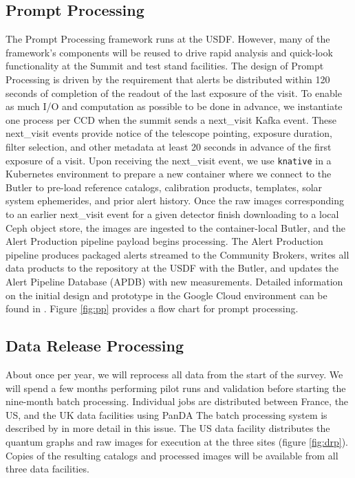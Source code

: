 \documentclass[11pt,twoside]{article}
\begin{document}
\subsection{Prompt Processing} \label{sec:prompt}
The Prompt Processing framework runs at the USDF. However, many of the framework's components will be reused to drive rapid analysis and quick-look functionality at the Summit and test stand facilities.
The design of Prompt Processing is driven by the requirement that alerts be distributed within 120 seconds of completion of the readout of the last exposure of the visit.
To enable as much I/O and computation as possible to be done in advance, we instantiate one process per CCD when the summit sends a next\_visit Kafka event.
These next\_visit events provide notice of the telescope pointing, exposure duration, filter selection, and other metadata at least 20 seconds in advance of the first exposure of a visit.
Upon receiving the next\_visit event, we use \texttt{knative} in a Kubernetes environment to prepare a new container where we connect to the Butler to pre-load reference catalogs, calibration products, templates, solar system ephemerides, and prior alert history.
Once the raw images corresponding to an earlier next\_visit event for a given detector finish downloading to a local Ceph object store, the images are ingested to the container-local Butler, and the Alert Production pipeline payload begins processing.
The Alert Production pipeline produces packaged alerts streamed to the Community Brokers, writes all data products to the repository at the USDF with the Butler, and updates the Alert Pipeline Database (APDB) with new measurements.
Detailed information on the initial design and prototype in the Google Cloud environment can be found in \citet{DMTN-219}.
Figure \ref{fig:pp} provides a flow chart for prompt processing.

\begin{centering}
\end{centering}

\subsection{Data Release Processing}\label{sec:DRP}
About once per year, we will reprocess all data from the start of the survey.
We will spend a few months performing pilot runs and validation before starting the nine-month batch processing.
Individual jobs are distributed between France, the US, and the UK data facilities using PanDA \citep{DMTN-213}
The batch processing system is described by \citet{P52_adassxxxii} in more detail in this issue.
The US data facility distributes the quantum graphs and raw images for execution at the three sites (figure \ref{fig:drp}).
Copies of the resulting catalogs and processed images will be available from all three data facilities.
\end{document}
